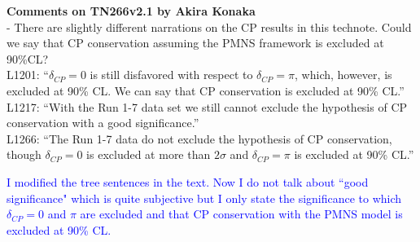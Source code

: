 \documentclass[final]{elsarticle}
\begin{document}
{\Large \textbf{Comments on TN266v2.1 by Akira Konaka}} \\

- There are slightly different narrations on the CP results in this technote. Could we say that CP conservation assuming the PMNS framework is excluded at 90\%CL? \\
L1201: ``$\delta_{CP} = 0$ is still disfavored with respect to $\delta_{CP} = \pi$, which, however, 
is excluded at 90\% CL. We can say that CP conservation is excluded at 90\% CL.'' \\
L1217: ``With the Run 1-7 data set we still cannot exclude the hypothesis of CP conservation with a good significance.'' \\ 
L1266: ``The Run 1-7 data do not exclude the hypothesis of CP conservation, though $\delta_{CP} = 0$ is excluded at more than $2\sigma$
 and $\delta_{CP} = \pi$ is excluded at 90\% CL.''


\textcolor{blue}{
I modified the tree sentences in the text. Now I do not talk about ``good significance" which is quite subjective
but I only state the significance to which $\delta_{CP} = 0$ and $\pi$ are excluded and that
CP conservation with the PMNS model is excluded at 90\% CL.  
}
\end{document}
